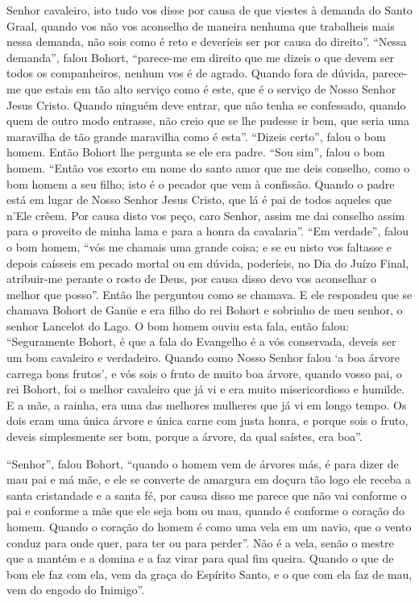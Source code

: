 Senhor cavaleiro, isto tudo vos disse por causa de que viestes à demanda do
Santo Graal, quando vos não vos aconselho de maneira nenhuma que trabalheis
mais nessa demanda, não sois como é reto e deveríeis ser por causa do direito”. 
“Nessa demanda”, falou Bohort, “parece-me em direito que me
dizeis o que devem ser todos os companheiros, nenhum vos é de agrado. Quando
fora de dúvida, parece-me que estais em tão alto serviço como é este, que é o
serviço de Nosso Senhor Jesus Cristo. Quando ninguém deve entrar, que não tenha
se confessado, quando quem de outro modo entrasse, não creio que se lhe pudesse
ir bem, que seria uma maravilha de tão grande maravilha como é esta”. “Dizeis
certo”, falou o bom homem. Então Bohort lhe pergunta se ele era padre. “Sou
sim”, falou o bom homem. “Então vos exorto  em nome do santo amor que me deis
conselho, como o bom homem a seu filho; isto é o pecador que vem à confissão.
Quando o padre está em lugar de Nosso Senhor Jesus Cristo, que lá é pai de
todos aqueles que n’Ele crêem. Por causa disto vos peço, caro Senhor, assim me
dai conselho assim para o proveito de minha lama e para a honra da cavalaria”. 
“Em verdade”, falou o bom homem, “vós me chamais uma grande coisa; e
se eu nisto vos faltasse e depois caísseis em pecado mortal ou em dúvida,
poderíeis, no Dia do Juízo Final, atribuir-me perante o rosto de Deus, por
causa disso devo vos aconselhar o melhor que posso”. Então lhe
perguntou como se chamava. E ele respondeu que se chamava Bohort de Gan\u{u}e e
era filho do rei Bohort e sobrinho de meu senhor,  o senhor Lancelot
do Lago. O bom homem ouviu esta fala,  então falou: “Seguramente Bohort, é que
a fala do Evangelho é a vós conservada, deveis ser um bom cavaleiro e
verdadeiro. Quando como Nosso Senhor falou ‘a boa árvore carrega bons frutos’,
e vós sois o fruto de muito boa árvore, quando vosso pai, o rei Bohort, foi o
melhor cavaleiro que já vi e era muito misericordioso e humilde. E a mãe, a
rainha, era uma das melhores mulheres que já vi em longo tempo. Os dois eram
uma única árvore e única carne com justa honra, e porque sois o fruto, deveis
simplesmente ser bom, porque a árvore, da qual saístes, era boa”. 

“Senhor”, falou Bohort, “quando o homem vem de árvores más, é para dizer de mau
pai e má mãe, e ele se converte de amargura em doçura tão logo ele receba a
santa cristandade e a santa fé, por causa disso me parece que não vai conforme
o pai e conforme a mãe que ele seja bom ou mau, quando é conforme o coração do
homem. Quando o coração do homem é como uma vela em um navio, que o vento
conduz para onde quer, para ter ou para perder”. Não é a vela, senão o mestre
que a mantém e a domina e a faz virar para qual fim queira. Quando o que de bom
ele faz com ela, vem da graça do Espírito Santo, e o que com ela faz de mau,
vem do engodo do Inimigo”. 

